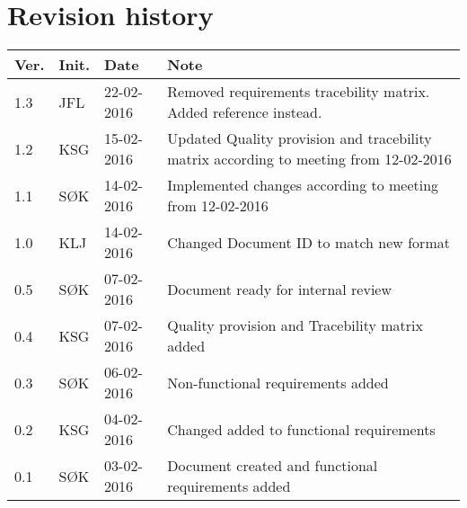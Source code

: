 \label{chp_revisionHistory}
\chapter*{Revision history}

\renewcommand\arraystretch{1.5}
\begin{tabular}{b{1cm} b{1cm} b{2cm} b{8cm}}
    \textbf{Ver.} & \textbf{Init.} & \textbf{Date} & \textbf{Note} \\
    \hline
    1.3 & JFL & 22-02-2016 & Removed requirements tracebility matrix. Added reference instead. \\
    \hline
    1.2 & KSG & 15-02-2016 & Updated Quality provision and tracebility matrix according to meeting from 12-02-2016 \\
    \hline
    1.1 & SØK & 14-02-2016 & Implemented changes according to meeting from 12-02-2016 \\ 
    \hline
    1.0 & KLJ & 14-02-2016 & Changed Document ID to match new format \\
    \hline
    0.5 & SØK & 07-02-2016 & Document ready for internal review \\
    \hline
    0.4 & KSG & 07-02-2016 & Quality provision and Tracebility matrix added \\
    \hline
    0.3 & SØK & 06-02-2016 & Non-functional requirements added \\
	\hline
	0.2 & KSG & 04-02-2016 & Changed added to functional requirements \\
    \hline
    0.1 & SØK  & 03-02-2016 & Document created and functional requirements added  \\
\end{tabular}
\renewcommand\arraystretch{1}